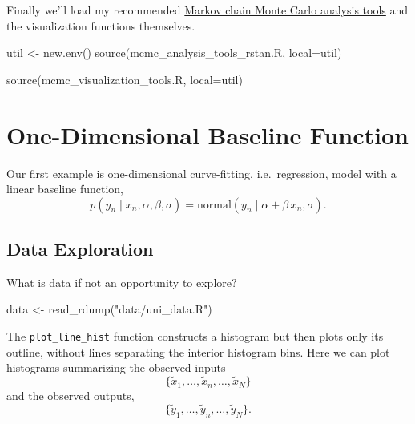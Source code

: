 \documentclass[
  letterpaper,
  DIV=11,
  numbers=noendperiod]{scrartcl}
\newenvironment{Shaded}{\begin{snugshade}}{\end{snugshade}}
\newcommand{\AttributeTok}[1]{\textcolor[rgb]{0.40,0.45,0.13}{#1}}
\newcommand{\FunctionTok}[1]{\textcolor[rgb]{0.28,0.35,0.67}{#1}}
\newcommand{\NormalTok}[1]{\textcolor[rgb]{0.00,0.23,0.31}{#1}}
\newcommand{\OtherTok}[1]{\textcolor[rgb]{0.00,0.23,0.31}{#1}}
\newcommand{\StringTok}[1]{\textcolor[rgb]{0.13,0.47,0.30}{#1}}
\begin{document}
Finally we'll load my recommended
\href{https://github.com/betanalpha/mcmc_diagnostics}{Markov chain Monte
Carlo analysis tools} and the visualization functions themselves.

\begin{Shaded}
\begin{Highlighting}[]
\NormalTok{util }\OtherTok{\textless{}{-}} \FunctionTok{new.env}\NormalTok{()}
\FunctionTok{source}\NormalTok{(}\StringTok{\textquotesingle{}mcmc\_analysis\_tools\_rstan.R\textquotesingle{}}\NormalTok{, }\AttributeTok{local=}\NormalTok{util)}
\end{Highlighting}
\end{Shaded}

\begin{Shaded}
\begin{Highlighting}[]
\FunctionTok{source}\NormalTok{(}\StringTok{\textquotesingle{}mcmc\_visualization\_tools.R\textquotesingle{}}\NormalTok{, }\AttributeTok{local=}\NormalTok{util)}
\end{Highlighting}
\end{Shaded}

\section{One-Dimensional Baseline
Function}\label{one-dimensional-baseline-function}

Our first example is one-dimensional curve-fitting, i.e.~regression,
model with a linear baseline function, \[
p(y_{n} \mid x_{n}, \alpha, \beta, \sigma)
=
\text{normal}(y_{n} \mid \alpha + \beta \, x_{n}, \sigma).
\]

\subsection{Data Exploration}\label{data-exploration}

What is data if not an opportunity to explore?

\begin{Shaded}
\begin{Highlighting}[]
\NormalTok{data }\OtherTok{\textless{}{-}} \FunctionTok{read\_rdump}\NormalTok{(}\StringTok{"data/uni\_data.R"}\NormalTok{)}
\end{Highlighting}
\end{Shaded}

The \texttt{plot\_line\_hist} function constructs a histogram but then
plots only its outline, without lines separating the interior histogram
bins. Here we can plot histograms summarizing the observed inputs \[
\{ \tilde{x}_{1}, \ldots, \tilde{x}_{n}, \ldots, \tilde{x}_{N} \}
\] and the observed outputs, \[
\{ \tilde{y}_{1}, \ldots, \tilde{y}_{n}, \ldots, \tilde{y}_{N} \}.
\]
\end{document}

